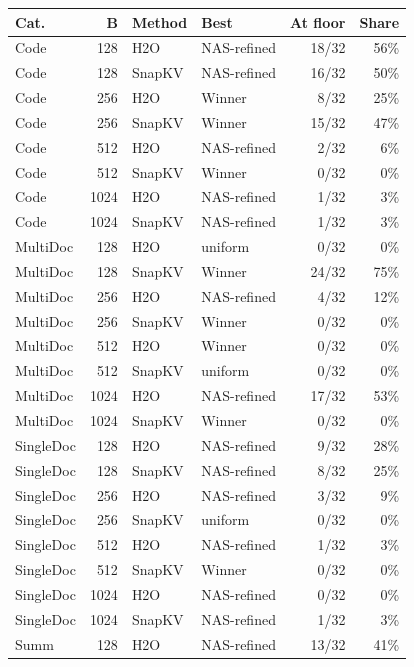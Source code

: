 \begin{table}[t]
  \centering
  \scriptsize
  \setlength{\tabcolsep}{3pt}
  \begin{tabular}{@{}l r l l r r@{}}
    \toprule
    Cat. & B & Method & Best & At floor & Share \\
    \midrule
    Code & 128 & H2O & NAS-refined & 18/32 & 56\% \\
    Code & 128 & SnapKV & NAS-refined & 16/32 & 50\% \\
    Code & 256 & H2O & Winner & 8/32 & 25\% \\
    Code & 256 & SnapKV & Winner & 15/32 & 47\% \\
    Code & 512 & H2O & NAS-refined & 2/32 & 6\% \\
    Code & 512 & SnapKV & Winner & 0/32 & 0\% \\
    Code & 1024 & H2O & NAS-refined & 1/32 & 3\% \\
    Code & 1024 & SnapKV & NAS-refined & 1/32 & 3\% \\
    MultiDoc & 128 & H2O & uniform & 0/32 & 0\% \\
    MultiDoc & 128 & SnapKV & Winner & 24/32 & 75\% \\
    MultiDoc & 256 & H2O & NAS-refined & 4/32 & 12\% \\
    MultiDoc & 256 & SnapKV & Winner & 0/32 & 0\% \\
    MultiDoc & 512 & H2O & Winner & 0/32 & 0\% \\
    MultiDoc & 512 & SnapKV & uniform & 0/32 & 0\% \\
    MultiDoc & 1024 & H2O & NAS-refined & 17/32 & 53\% \\
    MultiDoc & 1024 & SnapKV & Winner & 0/32 & 0\% \\
    SingleDoc & 128 & H2O & NAS-refined & 9/32 & 28\% \\
    SingleDoc & 128 & SnapKV & NAS-refined & 8/32 & 25\% \\
    SingleDoc & 256 & H2O & NAS-refined & 3/32 & 9\% \\
    SingleDoc & 256 & SnapKV & uniform & 0/32 & 0\% \\
    SingleDoc & 512 & H2O & NAS-refined & 1/32 & 3\% \\
    SingleDoc & 512 & SnapKV & Winner & 0/32 & 0\% \\
    SingleDoc & 1024 & H2O & NAS-refined & 0/32 & 0\% \\
    SingleDoc & 1024 & SnapKV & NAS-refined & 1/32 & 3\% \\
    Summ & 128 & H2O & NAS-refined & 13/32 & 41\% \\

\end{tabular}
\end{table}
